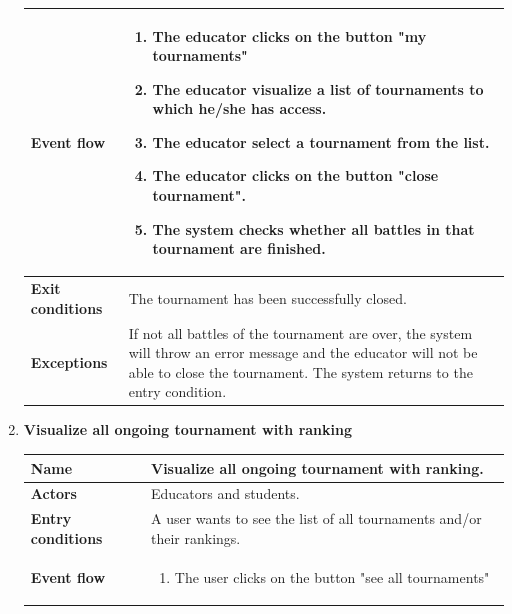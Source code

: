 \begin{enumerate}[label=\textbf{UC.\arabic*}]
\begin{table}[H]
\begin{tabular}{|m{3.2cm}|m{9.8cm}|}
                    \textbf{Event flow}  & 
                    \begin{enumerate}[label=\arabic*.]
                        \item The educator clicks on the button "my tournaments"
                        \item The educator visualize a list of tournaments to which he/she has access.
                        \item The educator select a tournament from the list.
                        \item The educator clicks on the button "close tournament".
                        \item The system checks whether all battles in that tournament are finished.
                    \end{enumerate}\\
                    \hline
                    \textbf{Exit conditions}  & The tournament has been successfully closed. \\
                    \hline
                    \textbf{Exceptions}  & If not all battles of the tournament are over, the system will throw an error message and the educator will not be able to close the tournament. The system returns to the entry condition.\\
                    \hline 
                \end{tabular}
        \end{table}
        \item {} \textbf{Visualize all ongoing tournament with ranking}
        \begin{table}[H]
    	    \centering
                \renewcommand{\arraystretch}{1.5}
                \begin{tabular}{|m{3.2cm}|m{9.8cm}|}
                    \hline
                    \textbf{Name} & Visualize all ongoing tournament with ranking.  \\
                    \hline
                    \textbf{Actors} & Educators and students. \\
                    \hline
                    \textbf{Entry conditions}  & A user wants to see the list of all tournaments and/or their rankings. \\
                    \hline
                    \textbf{Event flow}  & 
                    \begin{enumerate}[label=\arabic*.]
                        \item The user clicks on the button "see all tournaments"

\end{enumerate}
\end{tabular}
\end{table}
\end{enumerate}
